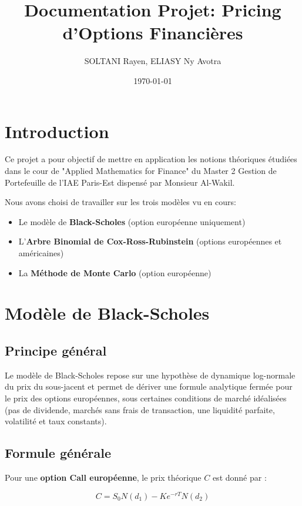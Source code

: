 \documentclass{article}
\title{Documentation Projet: Pricing d'Options Financières}
\author{SOLTANI Rayen, ELIASY Ny Avotra}
\date{\today}
\begin{document}
\maketitle

\tableofcontents
\newpage

\section{Introduction}

Ce projet a pour objectif de mettre en application les notions théoriques étudiées dans le cour de "Applied Mathematics for Finance" du Master 2 Gestion de Portefeuille de l'IAE Paris-Est dispensé par Monsieur Al-Wakil.

Nous avons choisi de travailler sur les trois modèles vu en cours:
\begin{itemize}
    \item Le modèle de \textbf{Black-Scholes} (option européenne uniquement)
    \item L'\textbf{Arbre Binomial de Cox-Ross-Rubinstein} (options européennes et américaines)
    \item La \textbf{Méthode de Monte Carlo} (option européenne)
\end{itemize}

\section{Modèle de Black-Scholes}
\subsection{Principe général}

Le modèle de Black-Scholes repose sur une hypothèse de dynamique log-normale du prix du sous-jacent et permet de dériver une formule analytique fermée pour le prix des options européennes, sous certaines conditions de marché idéalisées (pas de dividende, marchés sans frais de transaction, une liquidité parfaite, volatilité et taux constants).

\subsection{Formule générale}

Pour une \textbf{option Call européenne}, le prix théorique \( C \) est donné par :

\begin{equation}
C = S_0 N(d_1) - Ke^{-rT} N(d_2)
\end{equation}
\end{document}
